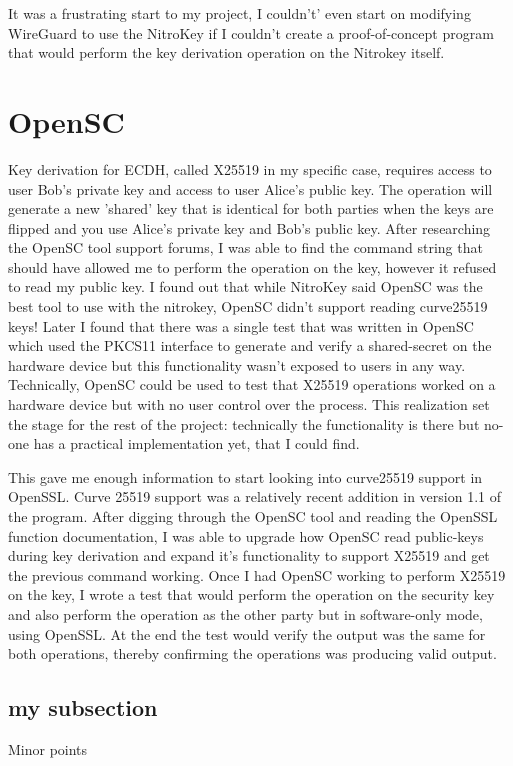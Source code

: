 \documentclass [11pt, proquest] {uwthesis}[2020/02/24]
\begin{document}
It was a frustrating start to my project, I couldn't' even start on modifying WireGuard to use the NitroKey if I couldn't create a proof-of-concept program that would perform the key derivation operation on the Nitrokey itself.
\section {OpenSC}
Key derivation for ECDH, called X25519 in my specific case, requires access to user Bob's private key and access to user Alice's public key. The operation will generate a new 'shared' key that is identical for both parties when the keys are flipped and you use Alice's private key and Bob's public key.
After researching the OpenSC tool support forums, I was able to find the command string that should have allowed me to perform the operation on the key, however it refused to read my public key. I found out that while NitroKey said OpenSC was the best tool to use with the nitrokey, OpenSC didn't support reading curve25519 keys! Later I found that there was a single test that was written in OpenSC which used the PKCS11 interface to generate and verify a shared-secret on the hardware device but this functionality wasn't exposed to users in any way. Technically, OpenSC could be used to test that X25519 operations worked on a hardware device but with no user control over the process. This realization set the stage for the rest of the project: technically the functionality is there but no-one has a practical implementation yet, that I could find.

This gave me enough information to start looking into curve25519 support in OpenSSL. Curve 25519 support was a relatively recent addition in version 1.1 of the program\cite{noauthor_support_nodate}.
After digging through the OpenSC tool and reading the OpenSSL function documentation, I was able to upgrade how OpenSC read public-keys during key derivation and expand it's functionality to support X25519 and get the previous command working.
Once I had OpenSC working to perform X25519 on the key, I wrote a test that would perform the operation on the security key and also perform the operation as the other party but in software-only mode, using OpenSSL. At the end the test would verify the output was the same for both operations, thereby confirming the operations was producing valid output.
\subsection {my subsection}
Minor points
\end{document}
